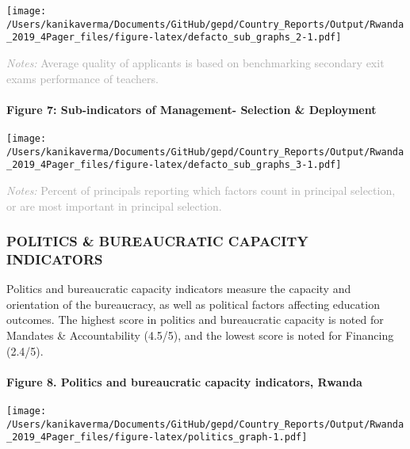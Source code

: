 \documentclass[twocolumn]{article}
\let\oldparagraph\paragraph
\renewcommand{\paragraph}[1]{\oldparagraph{#1}\mbox{}}
\begin{document}
\texttt{[image: /Users/kanikaverma/Documents/GitHub/gepd/Country\_Reports/Output/Rwanda\_2019\_4Pager\_files/figure-latex/defacto\_sub\_graphs\_2-1.pdf]}

{\scriptsize
    \textcolor{darkgray}{\textit{Notes:} Average quality of applicants is based on benchmarking secondary exit exams performance of teachers.}
  }

\hypertarget{figure-7-sub-indicators-of-management--selection-deployment}{%
\paragraph{Figure 7: Sub-indicators of Management- Selection \&
Deployment}\label{figure-7-sub-indicators-of-management--selection-deployment}}

\texttt{[image: /Users/kanikaverma/Documents/GitHub/gepd/Country\_Reports/Output/Rwanda\_2019\_4Pager\_files/figure-latex/defacto\_sub\_graphs\_3-1.pdf]}

{\scriptsize
    \textcolor{darkgray}{\textit{Notes:} Percent of principals reporting which factors count in principal selection, or are most important in principal selection.}
  }

\vfill\null

\hypertarget{politics-bureaucratic-capacity-indicators}{%
\subsubsection{\texorpdfstring{\textbf{POLITICS \& BUREAUCRATIC CAPACITY
INDICATORS}}{POLITICS \& BUREAUCRATIC CAPACITY INDICATORS}}\label{politics-bureaucratic-capacity-indicators}}

Politics and bureaucratic capacity indicators measure the capacity and
orientation of the bureaucracy, as well as political factors affecting
education outcomes. The highest score in politics and bureaucratic
capacity is noted for Mandates \& Accountability (4.5/5), and the lowest
score is noted for Financing (2.4/5).

\hypertarget{figure-8.-politics-and-bureaucratic-capacity-indicators-rwanda}{%
\paragraph{Figure 8. Politics and bureaucratic capacity indicators,
Rwanda}\label{figure-8.-politics-and-bureaucratic-capacity-indicators-rwanda}}

\texttt{[image: /Users/kanikaverma/Documents/GitHub/gepd/Country\_Reports/Output/Rwanda\_2019\_4Pager\_files/figure-latex/politics\_graph-1.pdf]}
\end{document}

